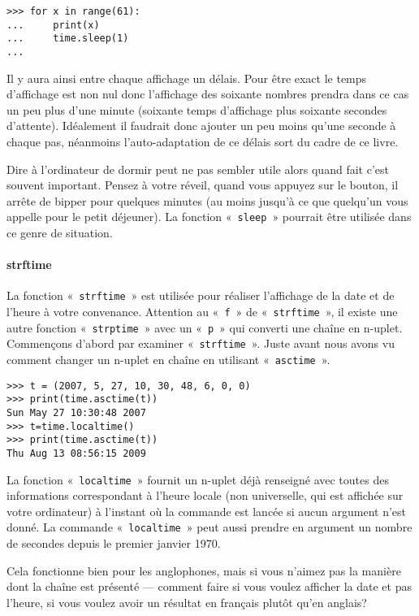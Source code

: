 \begin{Verbatim}[frame=single,rulecolor=\color{gray}]
>>> for x in range(61):
...     print(x)
...     time.sleep(1)
...
\end{Verbatim}
Il y aura ainsi entre chaque affichage un délais. Pour être exact le temps d'affichage est non nul donc l'affichage des soixante nombres prendra dans ce cas un peu plus d'une minute (soixante temps d'affichage plus soixante secondes d'attente). Idéalement il faudrait donc ajouter un peu moins qu'une seconde à chaque pas, néanmoins l'auto-adaptation de ce délais sort du cadre de ce livre.

Dire à l'ordinateur de dormir peut ne pas sembler utile alors quand fait c'est souvent important. Pensez à votre réveil, quand vous appuyez sur le bouton, il arrête de bipper pour quelques minutes (au moins jusqu'à ce que quelqu'un vous appelle pour le petit déjeuner). La fonction «~\texttt{sleep}~» pourrait être utilisée dans ce genre de situation.

\paragraph{strftime}

La fonction «~\texttt{strftime}~» est utilisée pour réaliser l'affichage de la date et de l'heure à votre convenance. Attention au «~\texttt{f}~» de «~\texttt{strftime}~», il existe une autre fonction «~\texttt{strptime}~» avec un «~\texttt{p}~» qui converti une chaîne en n-uplet.
Commençons d'abord par examiner «~\texttt{strftime}~».
Juste avant nous avons vu comment changer un n-uplet en chaîne en utilisant «~\texttt{asctime}~».

\begin{Verbatim}[frame=single,rulecolor=\color{gray}]
>>> t = (2007, 5, 27, 10, 30, 48, 6, 0, 0)
>>> print(time.asctime(t))
Sun May 27 10:30:48 2007
>>> t=time.localtime()
>>> print(time.asctime(t))
Thu Aug 13 08:56:15 2009
\end{Verbatim}



La fonction «~\texttt{localtime}~» fournit un n-uplet déjà renseigné avec toutes des informations correspondant à l'heure locale (non universelle, qui est affichée sur votre ordinateur) à l'instant où la commande est lancée si aucun argument n'est donné. La commande «~\texttt{localtime}~» peut aussi prendre en argument un nombre de secondes depuis le premier janvier 1970.   

Cela fonctionne bien pour les anglophones, mais si vous n'aimez pas la manière dont la chaîne est présenté --- comment faire si vous voulez afficher la date et pas l'heure, si vous voulez avoir un résultat en français plutôt qu'en anglais?

